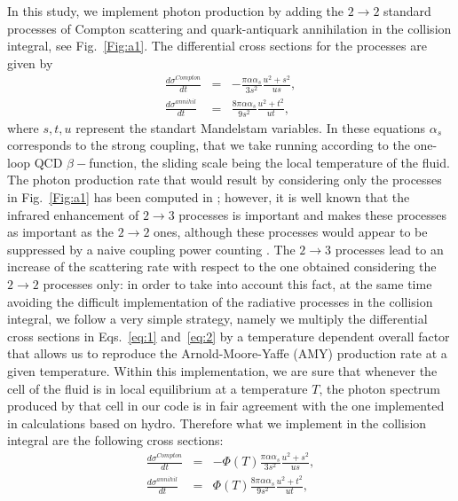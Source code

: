 \documentclass[aps,prc,a4paper,nofootinbib,
preprintnumbers,superscriptaddress,twocolumn,showpacs,showkeys]{revtex4}
\begin{document}
In this study, we implement photon production by adding the  $2\rightarrow2$ standard
processes of Compton scattering and quark-antiquark annihilation in the collision integral, 
see Fig.~\ref{Fig:a1}. 
The differential cross sections for the processes are given by
\begin{eqnarray}
\frac{d\sigma^{Compton}}{dt}&=&-\frac{\pi\alpha\alpha_s}{3s^2}\frac{u^2+s^2}{us},
\label{eq:1}
\\
\frac{d\sigma^{annihil}}{dt}&=&\frac{8\pi\alpha\alpha_s}{9s^2}\frac{u^2+t^2}{ut},\label{eq:2}
\end{eqnarray}
where $s,t,u$ represent the standart Mandelstam variables. 
In these equations $\alpha_s$ corresponds to the strong coupling, that we take running according to the
one-loop QCD $\beta-$function, the sliding scale being the local temperature of the fluid. 
The photon production rate
that would result by considering only the processes in Fig.~\ref{Fig:a1} has been computed
in \cite{Kapusta:1991qp,Baier:1991em,Baier:1991bz}; however, it is well known that the infrared enhancement of $2\rightarrow3$ processes is important
and makes these processes as important as the $2\rightarrow2$ ones, although 
these processes would appear to be suppressed by a naive coupling power counting \cite{arnold2001}.
The  $2\rightarrow3$ processes lead to an increase of the scattering rate with respect to the one 
obtained considering the $2\rightarrow2$ processes only: 
in order to take into account this fact, at the same time avoiding the difficult implementation
of the radiative processes in the collision integral, we follow a very simple strategy, namely
we multiply the differential cross sections in 
Eqs.~\eqref{eq:1} and~\eqref{eq:2} by a temperature dependent overall factor
that allows us to reproduce the Arnold-Moore-Yaffe (AMY) production rate \cite{arnold2001} at a given temperature.
Within this implementation, we are sure that whenever the cell of the fluid is in local equilibrium at a temperature $T$,
the photon spectrum produced by that cell in our code is in fair agreement with the one implemented in calculations
based on hydro. Therefore what we implement in the collision integral are the following cross sections:
\begin{eqnarray}
\frac{d\sigma^{Compton}}{dt}&=&-\Phi(T)\frac{\pi\alpha\alpha_s}{3s^2}\frac{u^2+s^2}{us},
\label{eq:1a}
\\
\frac{d\sigma^{annihil}}{dt}&=&\Phi(T)\frac{8\pi\alpha\alpha_s}{9s^2}\frac{u^2+t^2}{ut},\label{eq:2a}
\end{eqnarray}
\end{document}
